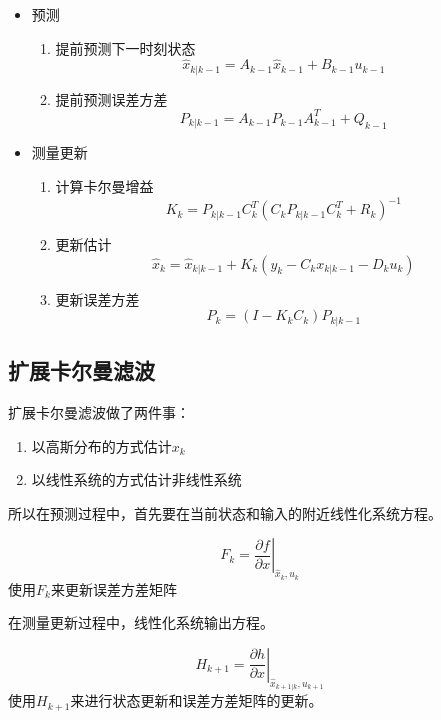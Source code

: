 \begin{theorembox}
\begin{itemize}
  \item 预测
  \begin{enumerate}
  \item 提前预测下一时刻状态
  	\begin{equation*}
  	\hat{x}_{k|k-1} = A_{k-1}\hat{x}_{k-1} + B_{k-1}u_{k-1}
	\end{equation*}
  \item 提前预测误差方差
  	\begin{equation*}
	P_{k|k-1}=A_{k-1}P_{k-1}A_{k-1}^T + Q_{k-1}  
	\end{equation*}
  \end{enumerate}
  \item 测量更新
  \begin{enumerate}
  	\item 计算卡尔曼增益
  	\begin{equation*}
  K_k = P_{k|k-1}C_k^T(C_kP_{k|k-1}C_k^T + R_k)^{-1}
\end{equation*}
  	\item 更新估计
  	\begin{equation*}
  		\hat{x}_{k} = \hat{x}_{k|k-1} + K_k(y_k - C_kx_{k|k-1} - D_ku_k)
  	\end{equation*}
  	\item 更新误差方差
  	\begin{equation*}
  		P_k = (I - K_kC_k)P_{k|k-1}
  	\end{equation*}
  \end{enumerate}
\end{itemize}

\end{theorembox}
\subsection{扩展卡尔曼滤波}
扩展卡尔曼滤波做了两件事：
\begin{enumerate}
  \item 以高斯分布的方式估计$x_k$
  \item 以线性系统的方式估计非线性系统
\end{enumerate}

所以在预测过程中，首先要在当前状态和输入的附近线性化系统方程。
\begin{theorembox}
	\begin{equation*}
		F_k  = \left .\frac{\partial f}{\partial x}\right |_{\hat{x}_k, u_k}
	\end{equation*}
	使用$F_k$来更新误差方差矩阵\\
\end{theorembox}
在测量更新过程中，线性化系统输出方程。
\begin{theorembox}
	\begin{equation*}
		H_{k+1} = \left .\frac{\partial h}{\partial x}\right |_{\hat{x}_{k+1|k},u_{k+1}}
	\end{equation*}
	使用$H_{k+1}$来进行状态更新和误差方差矩阵的更新。
\end{theorembox}

